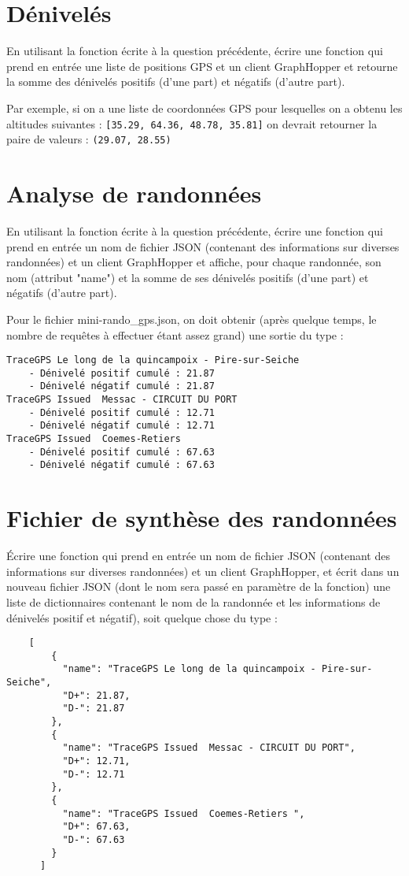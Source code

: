 \documentclass[11pt,a4paper]{article}
\begin{document}
\section{Dénivelés}

En utilisant la fonction écrite à la question précédente, écrire
une fonction qui prend en entrée une liste de positions GPS et un client GraphHopper et retourne la somme des dénivelés positifs (d’une part) et négatifs (d’autre part). 

Par exemple, si on a une liste de coordonnées GPS pour lesquelles on a obtenu les altitudes suivantes : \verb+[35.29, 64.36, 48.78, 35.81]+ on devrait retourner la paire de valeurs : \verb+(29.07, 28.55)+

\section{Analyse de randonnées}

En utilisant la fonction écrite à la question précédente, écrire une fonction qui prend en entrée un nom de fichier JSON (contenant des informations sur diverses randonnées) et un client GraphHopper et affiche, pour chaque randonnée, son nom (attribut "name") et la somme de ses dénivelés positifs (d’une part) et négatifs (d’autre part). 

Pour le fichier mini-rando\_gps.json, on doit obtenir (après quelque temps, le nombre de requêtes à effectuer étant assez grand) une sortie du type :
\begin{verbatim}
TraceGPS Le long de la quincampoix - Pire-sur-Seiche 
    - Dénivelé positif cumulé : 21.87
    - Dénivelé négatif cumulé : 21.87
TraceGPS Issued  Messac - CIRCUIT DU PORT 
    - Dénivelé positif cumulé : 12.71
    - Dénivelé négatif cumulé : 12.71
TraceGPS Issued  Coemes-Retiers  
    - Dénivelé positif cumulé : 67.63
    - Dénivelé négatif cumulé : 67.63
\end{verbatim}
\section{Fichier de synthèse des randonnées}

Écrire une fonction qui prend en entrée un nom de fichier JSON (contenant des informations sur diverses randonnées) et un client GraphHopper, et écrit dans un nouveau fichier JSON (dont le nom sera passé en paramètre de la fonction) une liste de dictionnaires contenant le nom de la randonnée et les informations de dénivelés positif et négatif), soit quelque chose du type :
\begin{verbatim}
    [
        {
          "name": "TraceGPS Le long de la quincampoix - Pire-sur-Seiche",
          "D+": 21.87,
          "D-": 21.87
        },
        {
          "name": "TraceGPS Issued  Messac - CIRCUIT DU PORT",
          "D+": 12.71,
          "D-": 12.71
        },
        {
          "name": "TraceGPS Issued  Coemes-Retiers ",
          "D+": 67.63,
          "D-": 67.63
        }
      ]
\end{verbatim}
\end{document}
